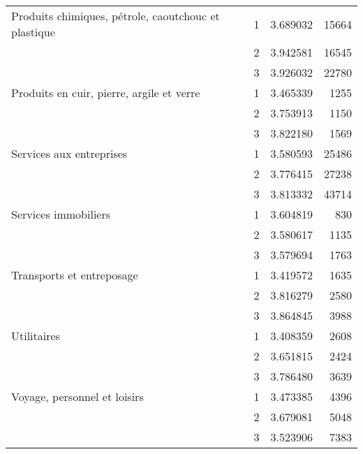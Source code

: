 \begin{tabular}{llrr}
Produits chimiques, pétrole, caoutchouc et plastique & 1 &  3.689032 &  15664 \\
                             & 2 &  3.942581 &  16545 \\
                             & 3 &  3.926032 &  22780 \\
Produits en cuir, pierre, argile et verre & 1 &  3.465339 &   1255 \\
                             & 2 &  3.753913 &   1150 \\
                             & 3 &  3.822180 &   1569 \\
Services aux entreprises & 1 &  3.580593 &  25486 \\
                             & 2 &  3.776415 &  27238 \\
                             & 3 &  3.813332 &  43714 \\
Services immobiliers & 1 &  3.604819 &    830 \\
                             & 2 &  3.580617 &   1135 \\
                             & 3 &  3.579694 &   1763 \\
Transports et entreposage & 1 &  3.419572 &   1635 \\
                             & 2 &  3.816279 &   2580 \\
                             & 3 &  3.864845 &   3988 \\
Utilitaires & 1 &  3.408359 &   2608 \\
                             & 2 &  3.651815 &   2424 \\
                             & 3 &  3.786480 &   3639 \\
Voyage, personnel et loisirs & 1 &  3.473385 &   4396 \\
                             & 2 &  3.679081 &   5048 \\
                             & 3 &  3.523906 &   7383 \\
\bottomrule
\end{tabular}

